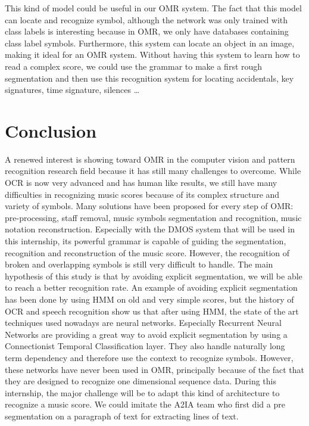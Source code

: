 \documentclass[11pt]{sdm}
\begin{document}
This kind of model could be useful in our OMR system.
The fact that this model can locate and recognize symbol, although the network was only trained with class labels is interesting because in OMR, we only have databases containing class label symbols.
Furthermore, this system can locate an object in an image, making it ideal for an OMR system.
Without having this system to learn how to read a complex score, we could use the grammar to make a first rough segmentation and then use this recognition system for locating accidentals, key signatures, time signature, silences \ldots

\section{Conclusion}

A renewed interest is showing toward OMR in the computer vision and pattern recognition research field because it has still many challenges to overcome.
While OCR is now very advanced and has human like results, we still have many difficulties in recognizing music scores because of its complex structure and variety of symbols.
Many solutions have been proposed for every step of OMR: pre-processing, staff removal, music symbols segmentation and recognition, music notation reconstruction.
Especially with the DMOS system that will be used in this internship, its powerful grammar is capable of guiding the segmentation, recognition and reconstruction of the music score.
However, the recognition of broken and overlapping symbols is still very difficult to handle.
The main hypothesis of this study is that by avoiding explicit segmentation, we will be able to reach a better recognition rate.
An example of avoiding explicit segmentation has been done by using HMM on old and very simple scores, but the history of OCR and speech recognition show us that after using HMM, the state of the art techniques used nowadays are neural networks.
Especially Recurrent Neural Networks are providing a great way to avoid explicit segmentation by using a Connectionist Temporal Classification layer.
They also handle naturally long term dependency and therefore use the context to recognize symbols.
However, these networks have never been used in OMR, principally because of the fact that they are designed to recognize one dimensional sequence data.
During this internship, the major challenge will be to adapt this kind of architecture to recognize a music score.
We could imitate the A2IA team who first did a pre segmentation on a paragraph of text for extracting lines of text.
\end{document}
